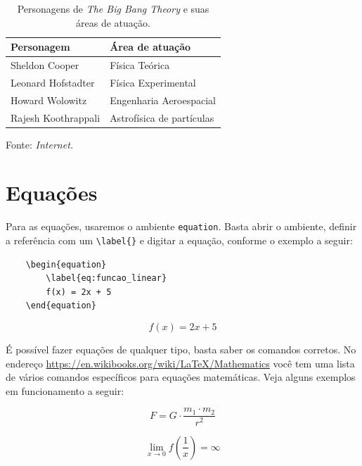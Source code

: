 \begin{table}[h]
    \centering
    \caption{Personagens de \emph{The Big Bang Theory} e suas áreas de atuação.}
    \label{tab:personagens}
    \begin{tabular}{ll}
        \hline
        \textbf{Personagem} & \textbf{Área de atuação}  \\ \hline
        Sheldon Cooper      & Física Teórica            \\
        Leonard Hofstadter  & Física Experimental       \\
        Howard Wolowitz     & Engenharia Aeroespacial   \\
        Rajesh Koothrappali & Astrofísica de partículas \\ \hline
    \end{tabular}
    \linebreak
    Fonte: \emph{Internet.}
\end{table}

\section{Equações}
\label{sec:equacoes}

Para as equações, usaremos o ambiente \verb=equation=. Basta abrir o ambiente, definir a referência com um \verb=\label{}= e digitar a equação, conforme o exemplo a seguir:

\begin{verbatim}
    \begin{equation}
        \label{eq:funcao_linear}
        f(x) = 2x + 5
    \end{equation}
\end{verbatim}

\begin{equation}
    \label{eq:funcao_linear}
    f(x) = 2x + 5
\end{equation}

É possível fazer equações de qualquer tipo, basta saber os comandos corretos. No endereço \url{https://en.wikibooks.org/wiki/LaTeX/Mathematics} você tem uma lista de vários comandos específicos para equações matemáticas. Veja alguns exemplos em funcionamento a seguir:

\begin{equation}
    \label{eq:gravidade}
    F = G \cdot \frac{m_1 \cdot m_2}{r^2}
\end{equation}

\begin{equation}
    \label{eq:limites}
    \lim\limits_{x \to 0} f\left(\frac{1}{x}\right) = \infty
\end{equation}


